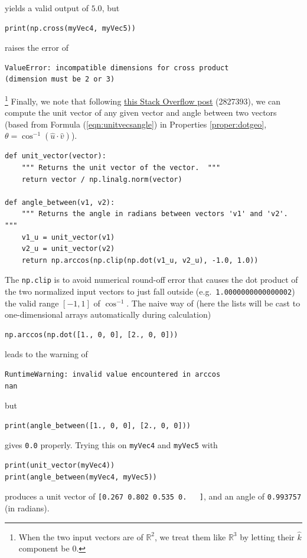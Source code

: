 yields a valid output of $5.0$, but
\begin{lstlisting}
print(np.cross(myVec4, myVec5))
\end{lstlisting}
raises the error of
\begin{lstlisting}
ValueError: incompatible dimensions for cross product
(dimension must be 2 or 3)    
\end{lstlisting}
\footnote{When the two input vectors are of $\mathbb{R}^2$, we treat them like $\mathbb{R}^3$ by letting their $\hat{k}$ component be $0$.} Finally, we note that following \href{https://stackoverflow.com/questions/2827393/angles-between-two-n-dimensional-vectors-in-python}{this Stack Overflow post} (2827393), we can compute the unit vector of any given vector and angle between two vectors (based from Formula (\ref{eqn:unitvecsangle}) in Properties \ref{proper:dotgeo}, $\theta = \cos^{-1}(\hat{u} \cdot \hat{v})$).
\begin{lstlisting}
def unit_vector(vector):
    """ Returns the unit vector of the vector.  """
    return vector / np.linalg.norm(vector)

def angle_between(v1, v2):
    """ Returns the angle in radians between vectors 'v1' and 'v2'. """
    v1_u = unit_vector(v1)
    v2_u = unit_vector(v2)
    return np.arccos(np.clip(np.dot(v1_u, v2_u), -1.0, 1.0))
\end{lstlisting}
The \verb|np.clip| is to avoid numerical round-off error that causes the dot product of the two normalized input vectors to just fall outside (e.g.\ \verb|1.0000000000000002|) the valid range $[-1, 1]$ of $\cos^{-1}$. The naive way of (here the lists will be cast to one-dimensional arrays automatically during calculation) 
\begin{lstlisting}
np.arccos(np.dot([1., 0, 0], [2., 0, 0]))
\end{lstlisting}
leads to the warning of
\begin{lstlisting}
RuntimeWarning: invalid value encountered in arccos  
nan
\end{lstlisting}
but
\begin{lstlisting}
print(angle_between([1., 0, 0], [2., 0, 0]))
\end{lstlisting}
gives \verb|0.0| properly. Trying this on \verb|myVec4| and \verb|myVec5| with
\begin{lstlisting}
print(unit_vector(myVec4))
print(angle_between(myVec4, myVec5))
\end{lstlisting}
produces a unit vector of \verb|[0.267 0.802 0.535 0.   ]|, and an angle of \verb|0.993757| (in radians).

